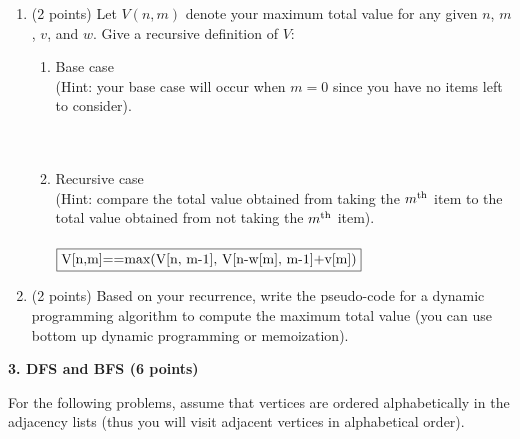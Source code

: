 \documentclass[12pt]{elsart}
\begin{document}
\begin{enumerate}
\begin{enumerate}
      \item (2 points) Let $V(n,m)$ denote your maximum total value for any given $n$, $m$, $v$, and $w$.  Give a recursive definition of $V$:
   \begin{enumerate}
      \item Base case \\(Hint: your base case will occur when $m=0$ since you have no items left to consider).\\\\
		\\
      \item Recursive case \\(Hint: compare the total value obtained from taking the $m\textsuperscript{th}$ item to the total value obtained from not taking the $m\textsuperscript{th}$ item).\\\\
	$\boxed{$V[n,m]==max(V[n, m-1], V[n-w[m], m-1]+v[m])$}$\\
   \end{enumerate}
      \item (2 points) Based on your recurrence, write the pseudo-code for a dynamic programming algorithm to compute the maximum total value (you can use bottom up dynamic programming or memoization).
   \end{enumerate}
\end{enumerate}

{\bf 3.  DFS and BFS (6 points)}

For the following problems, assume that vertices are ordered alphabetically in the adjacency lists (thus you will visit adjacent vertices in alphabetical order).
\end{document}
